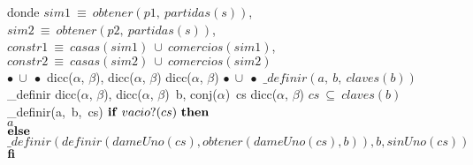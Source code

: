 \tab donde $sim1\ \equiv\ obtener(p1,\ partidas(s))$, \\
\tab\tab\tab \: $sim2\ \equiv\ obtener(p2,\ partidas(s))$, \\
\tab\tab\tab \: $constr1\ \equiv\ casas(sim1)\ \cup\ comercios(sim1)$, \\
\tab\tab\tab \: $constr2\ \equiv\ casas(sim2)\ \cup\ comercios(sim2)$
\\
\tadOperacion
    {$\bullet\ \cup\ \bullet$}
    {dicc($\alpha$, $\beta$), dicc($\alpha$, $\beta$)}
    {dicc($\alpha$, $\beta$)}
    {}
\tadAxioma
    {$\bullet\ \cup\ \bullet$}
    {$ \_definir(a,\ b,\ claves(b))$}
\vspace{4mm}
\tadOperacion
    {\_definir}
    {dicc($\alpha$, $\beta$), dicc($\alpha$, $\beta$)\ b, conj($\alpha$)\ cs}
    {dicc($\alpha$, $\beta$)}
    {$cs\ \subseteq\ claves(b)$}
\tadAxioma
    {\_definir(a,\ b,\ cs)}
    {$ 
    \LIF\ vacio?(cs)\ \LTHEN\ $\\$ 
    $\tab$ a $\\$
    \textrm{\textbf{else}} $\\$ 
    $\tab$ \_definir(definir(dameUno(cs), obtener(dameUno(cs), b)), b, sinUno(cs)) $\\$ 
    \textrm{\textbf{fi}}
    $}
